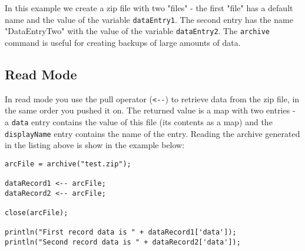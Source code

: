 In this example we create a zip file with two "files" - the first "file" has a default name and the value of the variable \Verb+dataEntry1+. The second entry has the name "DataEntryTwo" with the value of the variable \verb+dataEntry2+. The \verb+archive+ command is useful for creating backups of large amounts of \Rapture data.

\subsection{Read Mode}
In read mode you use the pull operator (\Verb+<--+) to retrieve data from the zip file, in the same order you pushed it on. The returned value is a map with two entries - a \verb+data+ entry contains the value of this file (its contents as a map) and the \verb+displayName+ entry contains the name of the entry. Reading the archive generated in the listing above is show in the example below:

\begin{lstlisting}[caption={Read from archive example}]
arcFile = archive("test.zip");

dataRecord1 <-- arcFile;
dataRecord2 <-- arcFile;

close(arcFile);

println("First record data is " + dataRecord1['data']);
println("Second record data is " + dataRecord2['data']);
\end{lstlisting}


